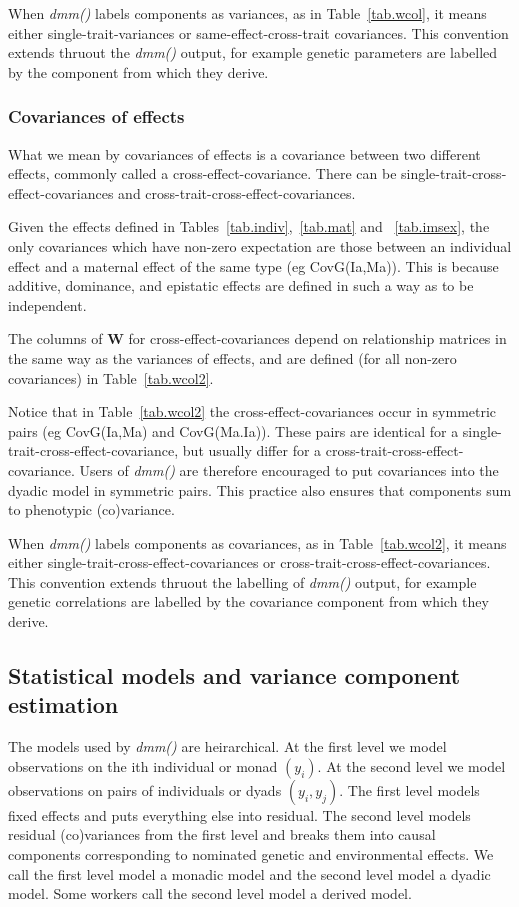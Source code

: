 \documentclass[titlepage]{article}  %
\begin{document}
When {\em dmm()} labels components as variances,  as in Table~\ref{tab.wcol}, it means either single-trait-variances or same-effect-cross-trait covariances. This convention extends thruout the {\em dmm()} output, for example genetic parameters are labelled by the component from which they derive.

\subsubsection{Covariances of effects}
What we mean by covariances of effects is a covariance between two different effects, commonly called a cross-effect-covariance. There can be single-trait-cross-effect-covariances and cross-trait-cross-effect-covariances. 

Given the effects defined in Tables~\ref{tab.indiv},~\ref{tab.mat} and ~\ref{tab.imsex}, the only covariances which have non-zero expectation are those between an individual effect and a maternal effect of the same type (eg CovG(Ia,Ma)). This is because additive, dominance, and epistatic effects are defined in such a way as to be independent.

The columns of ${\bm W}$ for cross-effect-covariances depend on relationship matrices in the same way as the variances of effects, and are defined (for all non-zero covariances) in Table~\ref{tab.wcol2}. 



Notice that in Table~\ref{tab.wcol2} the cross-effect-covariances occur in symmetric pairs (eg CovG(Ia,Ma) and CovG(Ma.Ia)). These pairs are identical for a single-trait-cross-effect-covariance, but usually differ for a cross-trait-cross-effect-covariance. Users of {\em dmm()} are therefore encouraged to put covariances into the dyadic model in symmetric pairs. This practice also ensures that components sum to phenotypic (co)variance.

When {\em dmm()} labels components as covariances, as in Table~\ref{tab.wcol2}, it means either single-trait-cross-effect-covariances or cross-trait-cross-effect-covariances. This convention extends thruout the labelling of {\em dmm()} output, for example genetic correlations are labelled by the covariance component from which they derive.


\clearpage
\subsection{Statistical models and variance component estimation} 
\label{stat}
 The models used by {\em dmm()} are heirarchical. At the first level we model observations on the ith individual or monad $(y_{i})$. At the second level we model observations on pairs of individuals or dyads $(y_{i},y_{j})$. The first level models fixed effects and puts everything else into residual. The second level models residual (co)variances from the first level and breaks them into causal components corresponding to nominated genetic and environmental effects.  We call the first level model a monadic model and the second level model a dyadic model. Some workers call the second level model a derived model.
\end{document}
